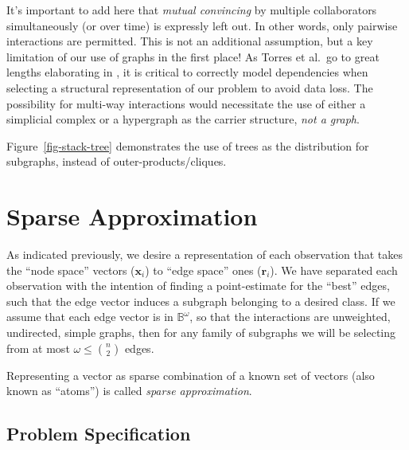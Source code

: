 \documentclass[%
	12pt,
		oneside,
		letterpaper
]{book}
\begin{document}
It's important to add here that \emph{mutual convincing} by multiple
collaborators simultaneously (or over time) is expressly left out. In
other words, only pairwise interactions are permitted. This is not an
additional assumption, but a key limitation of our use of graphs in the
first place! As Torres et al.~go to great lengths elaborating in
\autocite{WhyHowWhen_Torres2021}, it is critical to correctly model
dependencies when selecting a structural representation of our problem
to avoid data loss. The possibility for multi-way interactions would
necessitate the use of either a simplicial complex or a hypergraph as
the carrier structure, \emph{not a graph}.

Figure~\ref{fig-stack-tree} demonstrates the use of trees as the
distribution for subgraphs, instead of outer-products/cliques.

\section{Sparse Approximation}\label{sparse-approximation}

As indicated previously, we desire a representation of each observation
that takes the ``node space'' vectors (\(\mathbf{x}_i\)) to ``edge
space'' ones (\(\mathbf{r}_i\)). We have separated each observation with
the intention of finding a point-estimate for the ``best'' edges, such
that the edge vector induces a subgraph belonging to a desired class. If
we assume that each edge vector is in \(\mathbb{B}^{\omega}\), so that
the interactions are unweighted, undirected, simple graphs, then for any
family of subgraphs we will be selecting from at most
\(\omega\leq {n\choose 2}\) edges.

Representing a vector as sparse combination of a known set of vectors
(also known as ``atoms'') is called \emph{sparse approximation}.

\subsection{Problem Specification}\label{sec-fp-problem}
\end{document}
